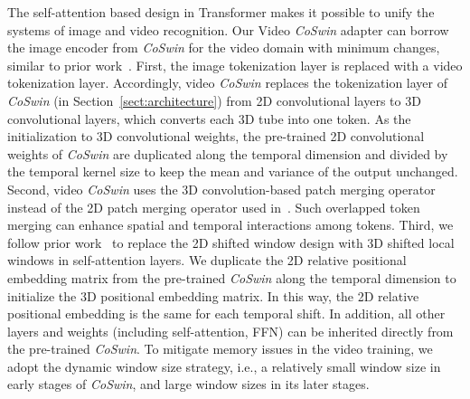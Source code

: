 \documentclass{article}
\begin{document}
The self-attention based design in Transformer makes it possible to unify the systems of image and video recognition. Our Video \emph{CoSwin} adapter can borrow the image encoder from \emph{CoSwin} for the video domain with minimum changes, similar to prior work~\cite{liu2021video}. First, the image tokenization layer is replaced with a video tokenization layer. Accordingly, video \emph{CoSwin} replaces the tokenization layer of \emph{CoSwin} (in Section~\ref{sect:architecture}) from 2D convolutional layers to 3D convolutional layers, which converts each 3D tube into one token. As the initialization to 3D convolutional weights, the pre-trained 2D convolutional weights of \emph{CoSwin} are duplicated along the temporal dimension and divided by the temporal kernel size to keep the mean and
variance of the output unchanged. Second,  video \emph{CoSwin} uses the 3D convolution-based patch merging operator instead of the 2D patch merging operator used in~\cite{liu2021video}. Such overlapped token merging
can enhance spatial and temporal interactions among tokens. Third, we follow prior work~\cite{liu2021video} to replace the 2D shifted window design with 3D shifted local windows in self-attention layers. We duplicate the 2D relative positional embedding matrix from the pre-trained \emph{CoSwin} along the temporal dimension to initialize the 3D positional embedding matrix. In this way, the 2D relative positional embedding is the same for each temporal shift. In addition, all other layers and weights
(including self-attention, FFN) can be inherited directly from the pre-trained \emph{CoSwin}. To mitigate memory issues in the video training, we adopt the dynamic window size strategy, i.e., a relatively small window size in early stages of \emph{CoSwin}, and large window sizes in its later stages.
\end{document}
